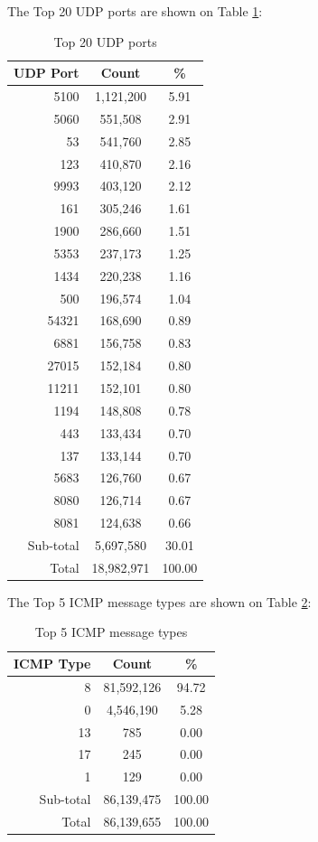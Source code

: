 \newpage
The Top 20 UDP ports are shown on Table \ref{tab:top20udpports}:
\begin{table}[!h]
\begin{center}
\caption{Top 20 UDP ports}
\label{tab:top20udpports}
\begin{tabular}{ |r|c|c| }
\hline
\centering UDP Port & Count & \%  \\
\hline
5100 & 1,121,200 & 5.91  \\
5060 & 551,508 & 2.91  \\
53 & 541,760 & 2.85  \\
123 & 410,870 & 2.16  \\
9993 & 403,120 & 2.12  \\
161 & 305,246 & 1.61  \\
1900 & 286,660 & 1.51  \\
5353 & 237,173 & 1.25  \\
1434 & 220,238 & 1.16  \\
500 & 196,574 & 1.04  \\
54321 & 168,690 & 0.89  \\
6881 & 156,758 & 0.83  \\
27015 & 152,184 & 0.80  \\
11211 & 152,101 & 0.80  \\
1194 & 148,808 & 0.78  \\
443 & 133,434 & 0.70  \\
137 & 133,144 & 0.70  \\
5683 & 126,760 & 0.67  \\
8080 & 126,714 & 0.67  \\
8081 & 124,638 & 0.66  \\
\hline
Sub-total & 5,697,580 & 30.01  \\
\hline
Total & 18,982,971 & 100.00  \\
\hline
\end{tabular}
\end{center}
\end{table}

\newpage
The Top 5 ICMP message types are shown on Table \ref{tab:top5icmpmessagetypes}:
\begin{table}[!h]
\begin{center}
\caption{Top 5 ICMP message types}
\label{tab:top5icmpmessagetypes}
\begin{tabular}{ |r|c|c| }
\hline
\centering ICMP Type & Count & \%  \\
\hline
8 & 81,592,126 & 94.72  \\
0 & 4,546,190 & 5.28  \\
13 & 785 & 0.00  \\
17 & 245 & 0.00  \\
1 & 129 & 0.00  \\
\hline
Sub-total & 86,139,475 & 100.00  \\
\hline
Total & 86,139,655 & 100.00  \\
\hline
\end{tabular}
\end{center}
\end{table}

